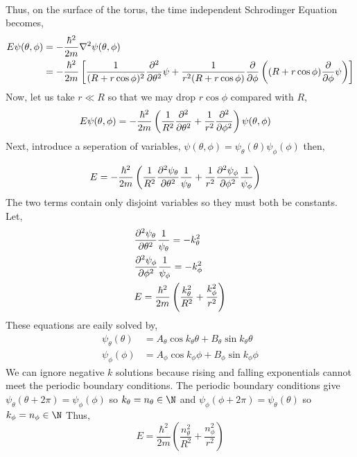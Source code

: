 \documentclass[12pt]{extarticle}
\begin{document}
\begin{enumerate}
\begin{align*}
\end{align*}
Thus, on the surface of the torus, the time independent Schrodinger Equation becomes, 
\begin{align*} E \psi(\theta, \phi) &= - \frac{\hbar^2}{2m} \nabla^2 \psi(\theta, \phi) \\ & = - \frac{\hbar^2}{2m} \left[ \frac{1}{(R + r \cos{\phi})^2} \frac{\partial^2{}}{\partial{\theta}^2} \psi + \frac{1}{r^2 (R + r \cos{\phi})} \frac{\partial{}}{\partial{\phi}} \left( (R + r \cos{\phi}) \frac{\partial{}}{\partial{\phi}} \psi \right) \right]
\end{align*}
Now, let us take $r \ll R$ so that we may drop $r \cos{\phi}$ compared with $R$,
\begin{align*} E \psi(\theta, \phi) &= - \frac{\hbar^2}{2m} \left( \frac{1}{R^2} \frac{\partial^2{}}{\partial{\theta}^2} + \frac{1}{r^2} \frac{\partial^2{}}{\partial{\phi}^2} \right) \psi(\theta, \phi)
\end{align*}
Next, introduce a seperation of variables, $\psi(\theta, \phi) = \psi_\theta(\theta) \psi_\phi(\phi)$ then,

\begin{align*} E &= - \frac{\hbar^2}{2m} \left( \frac{1}{R^2} \frac{\partial^2{\psi_\theta}}{\partial{\theta}^2} \frac{1}{\psi_\theta} + \frac{1}{r^2} \frac{\partial^2{\psi_\phi}}{\partial{\phi}^2} \frac{1}{\psi_\phi} \right)
\end{align*}
The two terms contain only disjoint variables so they must both be constants. Let,
\begin{align*} & \frac{\partial^2{\psi_\theta}}{\partial{\theta}^2} \frac{1}{\psi_\theta} = -k_\theta^2 \\
& \frac{\partial^2{\psi_\phi}}{\partial{\phi}^2} \frac{1}{\psi_\phi} = -k_\phi^2 \\
& E = \frac{\hbar^2}{2m} \left(\frac{k_\theta^2}{R^2} + \frac{k_\phi^2}{r^2} \right)
\end{align*}
These equations are eaily solved by, 
\begin{align*}
\psi_\theta(\theta) &= A_\theta \cos{k_\theta \theta} + B_\theta \sin{k_\theta \theta} \\
\psi_\phi(\phi) &= A_\phi \cos{k_\phi \phi} + B_\phi \sin{k_\phi \phi} 
\end{align*} 
We can ignore negative $k$ solutions because rising and falling exponentials cannot meet the periodic boundary conditions. The periodic boundary conditions give $\psi_\theta(\theta +  2\pi) = \psi_\phi(\phi)$ so $k_\theta = n_\theta \in \N$ and $\psi_\phi(\phi +  2\pi) = \psi_\theta(\theta)$ so $k_\phi = n_\phi \in \N$ Thus, \[E = \frac{\hbar^2}{2m} \left(\frac{n_\theta^2}{R^2} + \frac{n_\phi^2}{r^2} \right)\] 

\end{enumerate}
\end{document}
